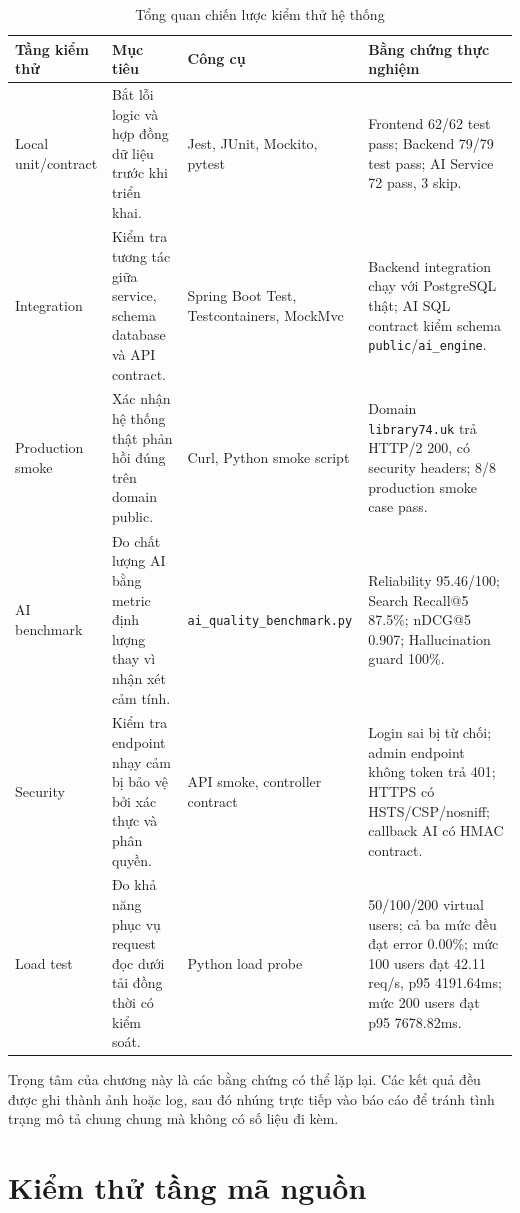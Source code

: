 \begin{table}[H]
\centering
\small
\renewcommand{\arraystretch}{1.35}
\begin{tabularx}{\textwidth}{|p{2.9cm}|p{3.6cm}|p{2.8cm}|X|}
\hline
\textbf{Tầng kiểm thử} & \textbf{Mục tiêu} & \textbf{Công cụ} & \textbf{Bằng chứng thực nghiệm} \\
\hline
Local unit/contract &
Bắt lỗi logic và hợp đồng dữ liệu trước khi triển khai. &
Jest, JUnit, Mockito, pytest &
Frontend 62/62 test pass; Backend 79/79 test pass; AI Service 72 pass, 3 skip. \\
\hline
Integration &
Kiểm tra tương tác giữa service, schema database và API contract. &
Spring Boot Test, Testcontainers, MockMvc &
Backend integration chạy với PostgreSQL thật; AI SQL contract kiểm schema \texttt{public}/\texttt{ai\_engine}. \\
\hline
Production smoke &
Xác nhận hệ thống thật phản hồi đúng trên domain public. &
Curl, Python smoke script &
Domain \texttt{library74.uk} trả HTTP/2 200, có security headers; 8/8 production smoke case pass. \\
\hline
AI benchmark &
Đo chất lượng AI bằng metric định lượng thay vì nhận xét cảm tính. &
\texttt{ai\_quality\_}\allowbreak \texttt{benchmark.py} &
Reliability 95.46/100; Search Recall@5 87.5\%; nDCG@5 0.907; Hallucination guard 100\%. \\
\hline
Security &
Kiểm tra endpoint nhạy cảm bị bảo vệ bởi xác thực và phân quyền. &
API smoke, controller contract &
Login sai bị từ chối; admin endpoint không token trả 401; HTTPS có HSTS/CSP/nosniff; callback AI có HMAC contract. \\
\hline
Load test &
Đo khả năng phục vụ request đọc dưới tải đồng thời có kiểm soát. &
Python load probe &
50/100/200 virtual users; cả ba mức đều đạt error 0.00\%; mức 100 users đạt 42.11 req/s, p95 4191.64ms; mức 200 users đạt p95 7678.82ms. \\
\hline
\end{tabularx}
\caption{Tổng quan chiến lược kiểm thử hệ thống}
\label{tab:testing_strategy_overview}
\end{table}

Trọng tâm của chương này là các bằng chứng có thể lặp lại. Các kết quả đều được
ghi thành ảnh hoặc log, sau đó nhúng trực tiếp vào báo cáo để tránh tình trạng
mô tả chung chung mà không có số liệu đi kèm.

\section{Kiểm thử tầng mã nguồn}


